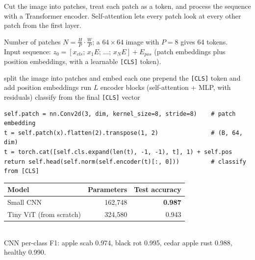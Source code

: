 \documentclass[11pt,a4paper]{article}
\begin{document}

\begin{bdef}
Cut the image into patches, treat each patch as a token, and process the sequence with a Transformer encoder. Self-attention lets every patch look at every other patch from the first layer.
\end{bdef}
\begin{bmath}
Number of patches $N=\frac{H}{P}\cdot\frac{W}{P}$; a $64\times64$ image with $P=8$ gives 64 tokens.\\[2pt]
Input sequence: $z_0=[x_{cls};\,x_1E;\,\dots;\,x_NE]+E_{pos}$ (patch embeddings plus position embeddings, with a learnable \texttt{[CLS]} token).
\end{bmath}
\begin{balgo}
\begin{algorithmic}[1]
\State split the image into patches and embed each one
\State prepend the \texttt{[CLS]} token and add position embeddings
\State run $L$ encoder blocks (self-attention + MLP, with residuals)
\State classify from the final \texttt{[CLS]} vector
\end{algorithmic}
\end{balgo}
\begin{bcode}
\begin{lstlisting}
self.patch = nn.Conv2d(3, dim, kernel_size=8, stride=8)    # patch embedding
t = self.patch(x).flatten(2).transpose(1, 2)               # (B, 64, dim)
t = torch.cat([self.cls.expand(len(t), -1, -1), t], 1) + self.pos
return self.head(self.norm(self.encoder(t)[:, 0]))         # classify from [CLS]
\end{lstlisting}
\end{bcode}
\begin{bres}
\begin{tabular}{lrr}
\toprule
Model & Parameters & Test accuracy\\
\midrule
Small CNN & 162,748 & \textbf{0.987}\\
Tiny ViT (from scratch) & 324,580 & 0.943\\
\bottomrule
\end{tabular}\\[3pt]
CNN per-class F1: apple scab 0.974, black rot 0.995, cedar apple rust 0.988, healthy 0.990.
\end{bres}
\end{document}
